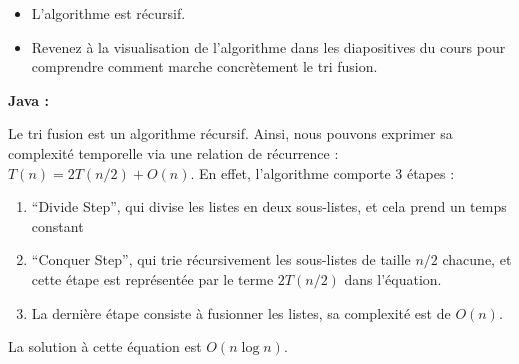 \begin{Exercice} [20 minutes]
    \begin{conseil}
    \begin{itemize}
        \item L'algorithme est récursif. 
        \item Revenez à la visualisation de l'algorithme dans les diapositives du cours pour comprendre comment marche concrètement le tri fusion. 
    \end{itemize}
    
    \end{conseil}
    
     \begin{solution}
        \textbf{Java :}
        
    \end{solution}
    \begin{solution}
        
        
        Le tri fusion est un algorithme récursif. Ainsi, nous pouvons exprimer sa complexité temporelle via une relation de récurrence : $T(n) = 2T(n/2) + O(n)$. En effet, l'algorithme comporte 3 étapes :
        \begin{enumerate}
            \item ``Divide Step'', qui divise les listes en deux sous-listes, et cela prend un temps constant
            \item ``Conquer Step'', qui trie récursivement les sous-listes de taille $n/2$ chacune, et cette étape est représentée par le terme $2T(n/2)$ dans l'équation.
            \item La dernière étape consiste à fusionner les listes, sa complexité est de $O(n)$.
        \end{enumerate}
        La solution à cette équation est $O(n \log n)$.
    \end{solution}
\end{Exercice}





